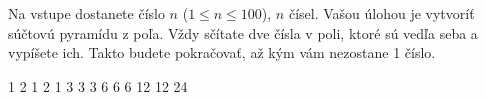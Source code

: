 




Na vstupe dostanete číslo $n$ ($1\leq n \leq 100$), $n$ čísel. Vašou úlohou je vytvoríť súčtovú
pyramídu z poľa. Vždy sčítate dve čísla v poli, ktoré sú vedľa seba a vypíšete ich. Takto budete
pokračovať, až kým vám nezostane 1 číslo.  

1 2 1 2 1
  3  3  3  
6  6  6  
12  12  
24  
\koniec


